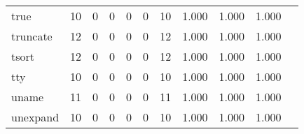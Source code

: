 \begin{longtable}{lp{1.20cm}p{1.20cm}p{1.20cm}p{1.20cm}p{1.20cm}p{1.20cm}p{1.20cm}p{1.20cm}p{1.20cm}p{1.20cm}}
true      &                                    10 &                                                  0 &                                                  0 &                                                  0 &                                                  0 &                                                 10 &                                         1.000 &                                              1.000 &                                              1.000 \\
truncate  &                                    12 &                                                  0 &                                                  0 &                                                  0 &                                                  0 &                                                 12 &                                         1.000 &                                              1.000 &                                              1.000 \\
tsort     &                                    12 &                                                  0 &                                                  0 &                                                  0 &                                                  0 &                                                 12 &                                         1.000 &                                              1.000 &                                              1.000 \\
tty       &                                    10 &                                                  0 &                                                  0 &                                                  0 &                                                  0 &                                                 10 &                                         1.000 &                                              1.000 &                                              1.000 \\
uname     &                                    11 &                                                  0 &                                                  0 &                                                  0 &                                                  0 &                                                 11 &                                         1.000 &                                              1.000 &                                              1.000 \\
unexpand  &                                    10 &                                                  0 &                                                  0 &                                                  0 &                                                  0 &                                                 10 &                                         1.000 &                                              1.000 &                                              1.000 \\

\end{longtable}
